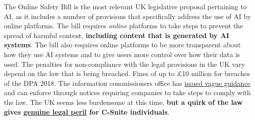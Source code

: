 The Online Safety Bill is the most relevant UK legislative proposal pertaining to AI, as it includes a number of provisions that specifically address the use of AI by online platforms. The bill requires \textit{online} platforms to take steps to prevent the spread of harmful content, \textbf{including content that is generated by AI systems}. The bill also requires online platforms to be more transparent about how they use AI systems and to give users more control over how their data is used. The penalties for non-compliance with the legal provisions in the UK vary depend on the law that is being breached. Fines of up to £10 million for breaches of the DPA 2018. The information commissioners office has \href{https://ico.org.uk/for-organisations/uk-gdpr-guidance-and-resources/artificial-intelligence/guidance-on-ai-and-data-protection/how-should-we-assess-security-and-data-minimisation-in-ai/}{issued vague guidance} and can enforce through notices requiring companies to take steps to comply with the law. The UK seems less burdensome at this time, \textbf{but a quirk of the law gives \href{https://webdevlaw.uk/2022/11/21/a-quick-hypothetical-situation-or-your-crash-introduction-to-the-real-world/}{genuine legal peril} for C-Suite individuals}. 